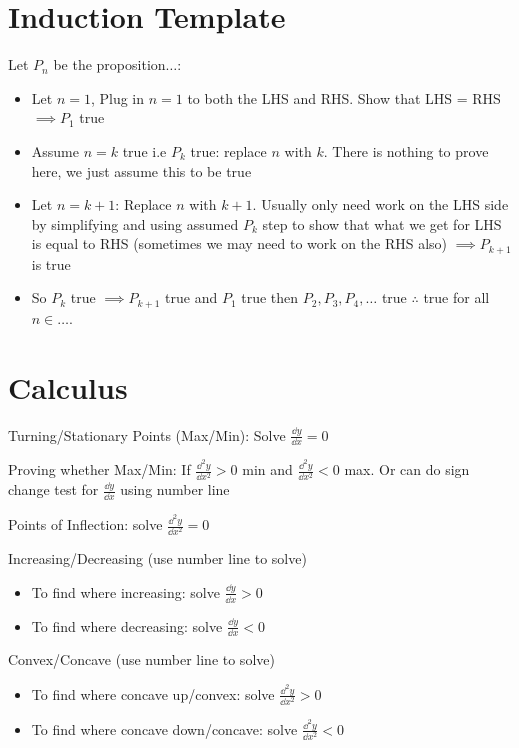 \documentclass[10pt,a4paper,oneside]{book}
\begin{document}
\section*{Induction Template}
Let $P_n$ be the proposition$\dots$:
\begin{itemize}
    \item Let $n=1$, Plug in $n=1$ to both the LHS and RHS. Show that LHS = RHS $\implies P_1$ true 
    \item Assume $n=k$ true i.e $P_k$ true: replace $n$ with $k$. There is nothing to prove here, we just assume this to be true 
    \item Let $n=k+1$: Replace $n$ with $k+1$. Usually only need work on the LHS side by simplifying and using assumed $P_k$ step to show that what we get for LHS is equal to RHS (sometimes we may need to work on the RHS also) $\implies P_{k+1}$ is true 
    \item So $P_k$ true $\implies P_{k+1}$ true and $P_1$ true then $P_2,P_3,P_4,\dots$ true $\therefore$ true for all $n\in \dots$.  
\end{itemize}



\section*{Calculus}
Turning/Stationary Points (Max/Min): Solve $\frac{\dd y}{\dd x}=0$

Proving whether Max/Min: If $\frac{\dd^2 y}{\dd x^2}>0$ min and $\frac{\dd^2 y}{\dd x^2}<0$ max. Or can do sign change test for $\frac{\dd y}{\dd x}$ using number line 

Points of Inflection: solve $\frac{\dd^2 y}{\dd x^2}=0$

Increasing/Decreasing (use number line to solve)
\begin{itemize}
    \item To find where increasing: solve $\frac{\dd y}{\dd x}>0$
    \item To find where decreasing: solve $\frac{\dd y}{\dd x}<0$
\end{itemize}

Convex/Concave (use number line to solve)
\begin{itemize}
    \item To find where concave up/convex: solve $\frac{\dd^2 y}{\dd x^2}>0$
    \item To find where concave down/concave: solve $\frac{\dd^2 y}{\dd x^2}<0$
\end{itemize}
\end{document}

